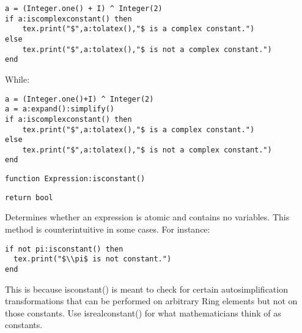 \documentclass{article}
\newcommand{\coderef}[2]{%
\begin{codehead}[sidebyside,segmentation hidden]%
    \texttt{#1}%
    \tcblower%
    \begin{flushright}%
    \texttt{#2}%
    \end{flushright}%
\end{codehead}%
}
\begin{document}
\begin{codebox}[]
    \begin{verbatim}
a = (Integer.one() + I) ^ Integer(2)
if a:iscomplexconstant() then 
    tex.print("$",a:tolatex(),"$ is a complex constant.")
else 
    tex.print("$",a:tolatex(),"$ is not a complex constant.")
end
\end{verbatim}
\tcblower
\begin{center}
\end{center}
\end{codebox}
While:
\begin{codebox}[]
    \begin{verbatim}
a = (Integer.one()+I) ^ Integer(2)
a = a:expand():simplify()
if a:iscomplexconstant() then 
    tex.print("$",a:tolatex(),"$ is a complex constant.")
else 
    tex.print("$",a:tolatex(),"$ is not a complex constant.")
end
\end{verbatim}
\tcblower
\begin{center}
\end{center}
\end{codebox}

\coderef{function Expression:isconstant()}{return bool}

Determines whether an expression is atomic and contains no variables. This method is counterintuitive in some cases. For instance:

\begin{codebox}
    \begin{verbatim}
if not pi:isconstant() then 
  tex.print("$\\pi$ is not constant.")
end  
\end{verbatim}
\tcblower
{}
\end{codebox}
This is because {\ttfamily isconstant()} is meant to check for certain autosimplification  transformations that can be performed on arbitrary {\ttfamily Ring} elements but not on those constants. Use {\ttfamily isrealconstant()} for what mathematicians think of as constants.
\end{document}
